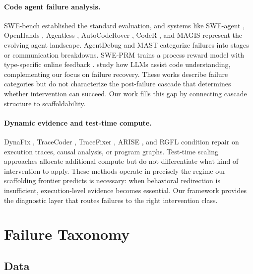 \documentclass[11pt]{article}
\begin{document}
\paragraph{Code agent failure analysis.}
SWE-bench \citep{jimenez2024swebench} established the standard evaluation, and systems like SWE-agent \citep{yang2024sweagent}, OpenHands \citep{wang2024openhands}, Agentless \citep{xia2024agentless}, AutoCodeRover \citep{zhang2024autocoderover}, CodeR \citep{chen2024coder}, and MAGIS \citep{tao2024magis} represent the evolving agent landscape.
AgentDebug \citep{zhu2025agentdebug} and MAST \citep{cemri2025mast} categorize failures into stages or communication breakdowns.
SWE-PRM \citep{gandhi2025sweprm} trains a process reward model with type-specific online feedback \citep{lightman2024lets, uesato2022solving}.
\citet{nam2024using} study how LLMs assist code understanding, complementing our focus on failure recovery.
These works describe failure categories but do not characterize the post-failure cascade that determines whether intervention can succeed.
Our work fills this gap by connecting cascade structure to scaffoldability.

\paragraph{Dynamic evidence and test-time compute.}
DynaFix \citep{huang2025dynafix}, TraceCoder \citep{huang2026tracecoder}, TraceFixer \citep{bouzenia2023tracefixer}, ARISE \citep{seddik2026arise}, and RGFL \citep{sepidband2026rgfl} condition repair on execution traces, causal analysis, or program graphs.
Test-time scaling approaches allocate additional compute but do not differentiate what kind of intervention to apply.
These methods operate in precisely the regime our scaffolding frontier predicts is necessary: when behavioral redirection is insufficient, execution-level evidence becomes essential.
Our framework provides the diagnostic layer that routes failures to the right intervention class.


\section{Failure Taxonomy}
\label{sec:taxonomy}

\subsection{Data}
\end{document}
